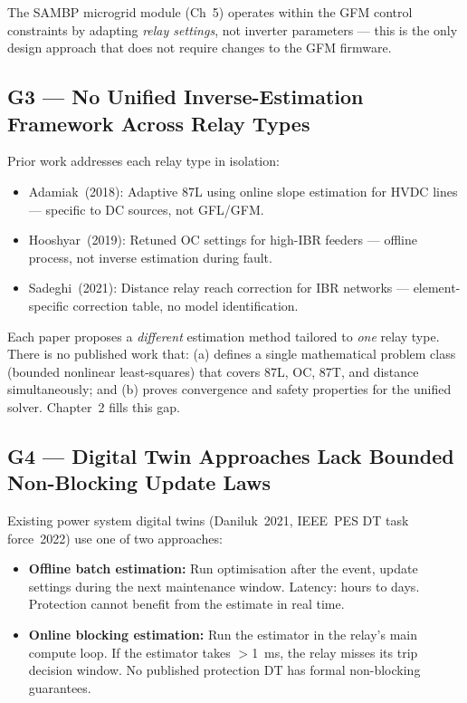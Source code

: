 \documentclass[12pt,a4paper]{article}
\begin{document}
The SAMBP microgrid module (Ch~5) operates within the GFM control constraints by
adapting \emph{relay settings}, not inverter parameters --- this is the only design
approach that does not require changes to the GFM firmware.

\subsection{G3 --- No Unified Inverse-Estimation Framework Across Relay Types}

Prior work addresses each relay type in isolation:
\begin{itemize}[nosep]
  \item Adamiak~(2018): Adaptive 87L using online slope estimation for HVDC
        lines --- specific to DC sources, not GFL/GFM.
  \item Hooshyar~(2019): Retuned OC settings for high-IBR feeders --- offline
        process, not inverse estimation during fault.
  \item Sadeghi~(2021): Distance relay reach correction for IBR networks ---
        element-specific correction table, no model identification.
\end{itemize}

Each paper proposes a \emph{different} estimation method tailored to \emph{one}
relay type.  There is no published work that:
(a) defines a single mathematical problem class (bounded nonlinear
least-squares) that covers 87L, OC, 87T, and distance simultaneously; and
(b) proves convergence and safety properties for the unified solver.
Chapter~2 fills this gap.

\subsection{G4 --- Digital Twin Approaches Lack Bounded Non-Blocking Update Laws}

Existing power system digital twins (Daniluk~2021, IEEE~PES DT task force~2022)
use one of two approaches:
\begin{itemize}[nosep]
  \item \textbf{Offline batch estimation:} Run optimisation after the event,
        update settings during the next maintenance window.  Latency: hours to days.
        Protection cannot benefit from the estimate in real time.
  \item \textbf{Online blocking estimation:} Run the estimator in the relay's
        main compute loop.  If the estimator takes $>$1~ms, the relay misses its
        trip decision window.  No published protection DT has formal non-blocking
        guarantees.
\end{itemize}
\end{document}
